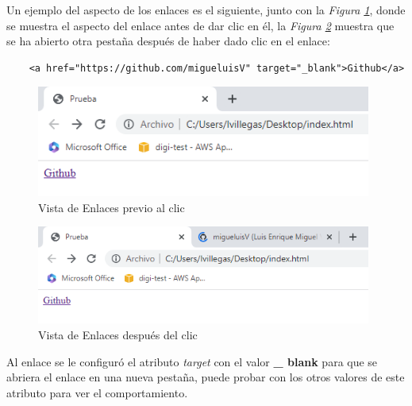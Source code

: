 Un ejemplo del aspecto de los enlaces es el siguiente, junto con la \textit{Figura \ref{fig: 6}}, donde se muestra el aspecto del enlace antes de dar clic en él, la \textit{Figura \ref{fig: 7}} muestra que se ha abierto otra pestaña después de haber dado clic en el enlace:
\begin{lstlisting}
    <a href="https://github.com/migueluisV" target="_blank">Github</a>
\end{lstlisting}
\begin{figure}[H]
    \centering
    \caption{Vista de Enlaces previo al clic}
    \label{fig: 6}
    \includegraphics[width=11cm]{ss_html/enlaces_1.png}
\end{figure}
\begin{figure}[H]
    \centering
    \caption{Vista de Enlaces después del clic}
    \label{fig: 7}
    \includegraphics[width=11cm]{ss_html/enlaces_2.png}
\end{figure}

Al enlace se le configuró el atributo \textit{target} con el valor \textbf{\_ blank} para que se abriera el enlace en una nueva pestaña, puede probar con los otros valores de este atributo para ver el comportamiento.


